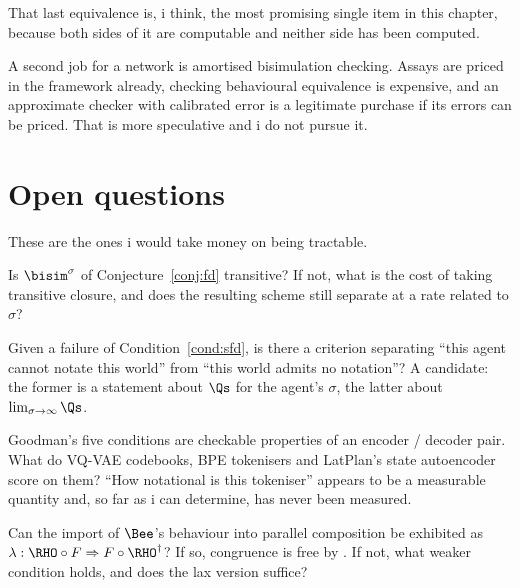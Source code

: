 That last equivalence is, i think, the most promising single item
in this chapter, because both sides of it are computable and
neither side has been computed.

A second job for a network is amortised bisimulation checking.
Assays are priced in the framework already, checking behavioural
equivalence is expensive, and an approximate checker with
calibrated error is a legitimate purchase if its errors can be
priced.
That is more speculative and i do not pursue it.

\section{Open questions}
\label{sec:notation-open}

These are the ones i would take money on being tractable.

\begin{question}
\label{q:trans}
Is $\bisim^{\sigma}$ of Conjecture~\ref{conj:fd} transitive?
If not, what is the cost of taking transitive closure, and does the
resulting scheme still separate at a rate related to $\sigma$?
\end{question}

\begin{question}
\label{q:density}
Given a failure of Condition~\ref{cond:sfd}, is there a criterion
separating ``this agent cannot notate this world'' from ``this
world admits no notation''?
A candidate: the former is a statement about $\Qs$ for the agent's
$\sigma$, the latter about $\lim_{\sigma \to \infty} \Qs$.
\end{question}

\begin{question}
\label{q:codebooks}
Goodman's five conditions are checkable properties of an
encoder / decoder pair.
What do VQ-VAE codebooks, BPE tokenisers and LatPlan's state
autoencoder score on them?
``How notational is this tokeniser'' appears to be a measurable
quantity and, so far as i can determine, has never been measured.
\end{question}

\begin{question}
\label{q:gsos}
Can the import of $\Bee$'s behaviour into parallel composition be
exhibited as $\lambda : \RHO \circ F \Rightarrow F \circ
\RHO^{\dagger}$?
If so, congruence is free by \cite{turiplotkin}.
If not, what weaker condition holds, and does the lax version
suffice?
\end{question}

